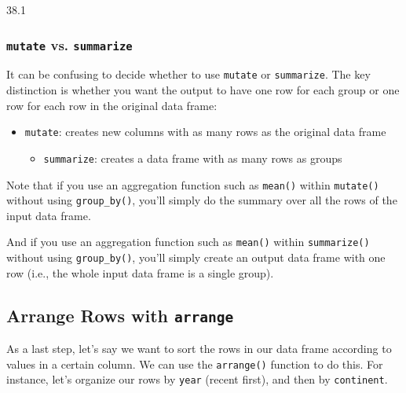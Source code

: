 \documentclass[]{book}
\providecommand{\tightlist}{%
  \setlength{\itemsep}{0pt}\setlength{\parskip}{0pt}}
\begin{document}
38.1

\hypertarget{mutate-vs.-summarize}{%
\subsubsection*{\texorpdfstring{\texttt{mutate} vs. \texttt{summarize}}{mutate vs. summarize}}\label{mutate-vs.-summarize}}

It can be confusing to decide whether to use \texttt{mutate} or \texttt{summarize}. The key distinction is whether you want the output to have one row for each group or one row for each row in the original data frame:

\begin{itemize}
\tightlist
\item
  \texttt{mutate}: creates new columns with as many rows as the original data frame

  \begin{itemize}
  \tightlist
  \item
    \texttt{summarize}: creates a data frame with as many rows as groups
  \end{itemize}
\end{itemize}

Note that if you use an aggregation function such as \texttt{mean()} within \texttt{mutate()} without using \texttt{group\_by()}, you'll simply do the summary over all the rows of the input data frame.

And if you use an aggregation function such as \texttt{mean()} within \texttt{summarize()} without using \texttt{group\_by()}, you'll simply create an output data frame with one row (i.e., the whole input data frame is a single group).

\hypertarget{arrange-rows-with-arrange}{%
\subsection{\texorpdfstring{Arrange Rows with \texttt{arrange}}{Arrange Rows with arrange}}\label{arrange-rows-with-arrange}}

As a last step, let's say we want to sort the rows in our data frame according to values in a certain column. We can use the \texttt{arrange()} function to do this. For instance, let's organize our rows by \texttt{year} (recent first), and then by \texttt{continent}.
\end{document}
